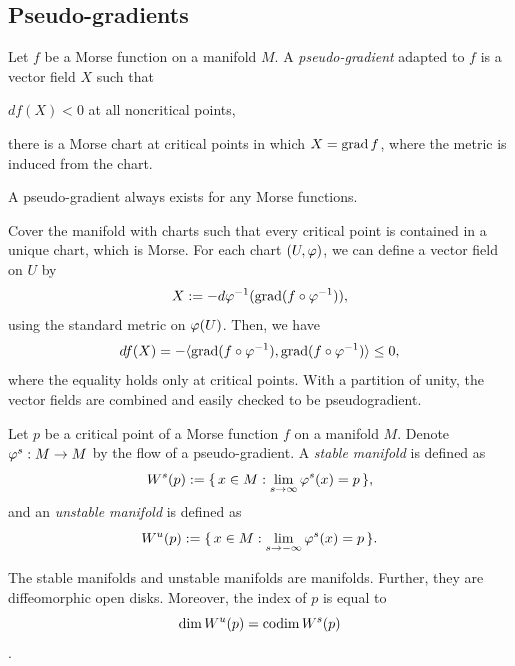 \documentclass{../../large}
\begin{document}
\section{Pseudo-gradients}
\begin{defn}
Let $f$ be a Morse function on a manifold $M$.
A \emph{pseudo-gradient} adapted to $f$ is a vector field $X$ such that
\begin{parts}
\item $df(X)<0$ at all noncritical points,
\item there is a Morse chart at critical points in which $X=\operatorname{grad} f$, where the metric is induced from the chart.
\end{parts}
\end{defn}
\begin{prop}
A pseudo-gradient always exists for any Morse functions.
\end{prop}
\begin{pf}
Cover the manifold with charts such that every critical point is contained in a unique chart, which is Morse.
For each chart $(U,\varphi)$, we can define a vector field on $U$ by
\[X:=-d\varphi^{-1}(\operatorname{grad}(f\circ\varphi^{-1})),\]
using the standard metric on $\varphi(U)$.
Then, we have
\[df(X)=-\langle\operatorname{grad}(f\circ\varphi^{-1}),\operatorname{grad}(f\circ\varphi^{-1})\rangle\le0,\]
where the equality holds only at critical points.
With a partition of unity, the vector fields are combined and easily checked to be pseudogradient.
\end{pf}

\begin{defn}
Let $p$ be a critical point of a Morse function $f$ on a manifold $M$.
Denote $\varphi^s:M\to M$ by the flow of a pseudo-gradient.
A \emph{stable manifold} is defined as
\[W^s(p):=\{\,x\in M:\lim_{s\to\infty}\varphi^s(x)=p\,\},\]
and an \emph{unstable manifold} is defined as
\[W^u(p):=\{\,x\in M:\lim_{s\to-\infty}\varphi^s(x)=p\,\}.\]
\end{defn}
\begin{prop}
The stable manifolds and unstable manifolds are manifolds.
Further, they are diffeomorphic open disks.
Moreover, the index of $p$ is equal to
\[\dim W^u(p)=\operatorname{codim} W^s(p)\].
\end{prop}


\chapter{}
\chapter{}
\end{document}
